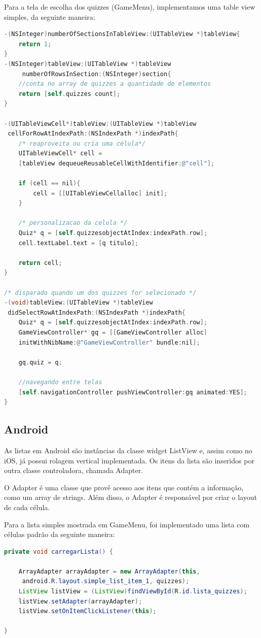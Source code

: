     Para a tela de escolha dos quizzes (GameMenu), implementamos uma table view simples, da seguinte maneira:
\begin{lstlisting}[language=C]  
-(NSInteger)numberOfSectionsInTableView:(UITableView *)tableView{
    return 1;
}
-(NSInteger)tableView:(UITableView *)tableView
	 numberOfRowsInSection:(NSInteger)section{
    //conta no array de quizzes a quantidade de elementos
    return [self.quizzes count];
}

-(UITableViewCell*)tableView:(UITableView *)tableView
 cellForRowAtIndexPath:(NSIndexPath *)indexPath{
    /* reaproveita ou cria uma célula*/
    UITableViewCell* cell = 
    [tableView dequeueReusableCellWithIdentifier:@"cell"];
	
    if (cell == nil){
        cell = [[UITableViewCellalloc] init];
    }
     
    /* personalizacao da celula */
    Quiz* q = [self.quizzesobjectAtIndex:indexPath.row];
    cell.textLabel.text = [q titulo];
	
    return cell;
}

/* disparado quando um dos quizzes for selecionado */
-(void)tableView:(UITableView *)tableView
 didSelectRowAtIndexPath:(NSIndexPath *)indexPath{
    Quiz* q = [self.quizzesobjectAtIndex:indexPath.row];
    GameViewController* gq = [[GameViewController alloc] 
	initWithNibName:@"GameViewController" bundle:nil];
    
	gq.quiz = q;
	
	//navegando entre telas
    [self.navigationController pushViewController:gq animated:YES];
}
\end{lstlisting} 
   
    \subsection{Android}
            
			As listas em Android são instâncias da classe widget ListView e, assim como no iOS, já possui rolagem vertical implementada. Os itens da lista são inseridos por outra classe controladora, chamada Adapter.
            
			O Adapter é uma classe que provê acesso aos itens que contém a informação, como um array de strings. Além disso, o Adapter é responsável por criar o layout de cada célula.
           
		    Para a lista simples mostrada em GameMenu, foi implementado uma lista com células padrão da seguinte maneira:
\begin{lstlisting}[language=Java,frame=single,breaklines=true]   
private void carregarLista() {
     
    ArrayAdapter arrayAdapter = new ArrayAdapter(this,
	 android.R.layout.simple_list_item_1, quizzes);
    ListView listView = (ListView)findViewById(R.id.lista_quizzes);
    listView.setAdapter(arrayAdapter);
    listView.setOnItemClickListener(this);
     
}
\end{lstlisting} 

